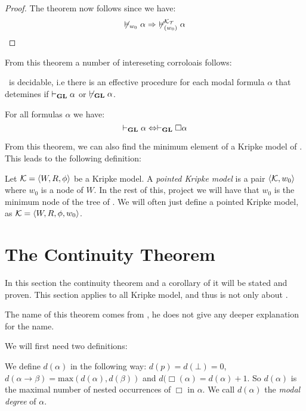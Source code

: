 \documentclass[../main.tex]{subfiles}
\begin{document}
\begin{proof}
	The theorem now follows since we have:
	\[\not\vDash_{w_0}\alpha\Rightarrow\
	\not\vDash_{(w_0)}^{\mathcal{K}_{\mathcal{T}}}\alpha\]
\end{proof}

From this theorem a number of intereseting corroloais follows: 

\begin{cor}
	\GL\ is decidable, i.e there is an effective procedure for each modal formula
	$\alpha$ that detemines if $\vdash_{\text{\textbf{GL}}}\alpha$ or
	$\not\vdash_{\text{\textbf{GL}}}\alpha$.
\end{cor}
\begin{cor}
	\label{cor:Nec}
	For all formulas $\alpha$ we have:
	\[\vdash_{\text{\textbf{GL}}}\alpha\Leftrightarrow\vdash_{\text{\textbf{GL}}}\Box\alpha\]
\end{cor}

From this theorem, we can also find the minimum element of a Kripke model of
\GL. This leads to the following definition:

\begin{defi}
	Let $\mathcal{K}=\langle W,R,\phi\rangle$ be a Kripke model. A \textit{pointed
	Kripke model} is a pair $\langle \mathcal{K},w_0\rangle$ where $w_0$ is a node
	of $W$. In the rest of this, project we will have that $w_0$ is the
	minimum node of the tree of \GL. We will often just define a pointed
	Kripke model, as $\mathcal{K}=\langle W,R,\phi,w_0\rangle$.
\end{defi}

\section{The Continuity Theorem}
In this section the continuity theorem and a corollary of it will be stated and
proven. This section applies to all Kripke model, and thus is not only about
\GL.

The name of this theorem comes from \parencite{Boolos1993}, he does not give
any deeper explanation for the name.

We will first need two definitions:
\begin{defi}
	We define $d(\alpha)$ in the following way: $d(p)=d(\bot)=0$,
	$d(\alpha\rightarrow\beta)=\text{max}(d(\alpha),d(\beta))$ and
	$d(\Box(\alpha)=d(\alpha)+1$. So $d(\alpha)$ is the maximal number of
	nested occurrences of $\Box$ in $\alpha$. We call $d(\alpha)$ the
	\textit{modal
	degree} of $\alpha$.
\end{defi}
\end{document}
